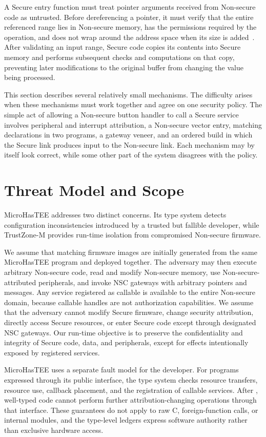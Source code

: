 \documentclass[sigconf]{acmart}
\begin{document}
A Secure entry function must treat pointer arguments received from Non-secure code as untrusted.
Before dereferencing a pointer, it must verify that the entire referenced range lies in Non-secure memory, has the permissions required by the operation, and does not wrap around the address space when its size is added~\cite{armCmse}.
After validating an input range, Secure code copies its contents into Secure memory and performs subsequent checks and computations on that copy, preventing later modifications to the original buffer from changing the value being processed.

This section describes several relatively small mechanisms.
The difficulty arises when these mechanisms must work together and agree on one security policy.
The simple act of allowing a Non-secure button handler to call a Secure service involves peripheral and interrupt attribution, a Non-secure vector entry, matching declarations in two programs, a gateway veneer, and an ordered build in which the Secure link produces input to the Non-secure link.
Each mechanism may by itself look correct, while some other part of the system disagrees with the policy.

\section{Threat Model and Scope}

MicroHasTEE addresses two distinct concerns.
Its type system detects configuration inconsistencies introduced by a trusted but fallible developer, while TrustZone-M provides run-time isolation from compromised Non-secure firmware.

We assume that matching firmware images are initially generated from the same MicroHasTEE program and deployed together.
The adversary may then execute arbitrary Non-secure code, read and modify Non-secure memory, use Non-secure-attributed peripherals, and invoke NSC gateways with arbitrary pointers and messages.
Any service registered as callable is available to the entire Non-secure domain, because callable handles are not authorization capabilities.
We assume that the adversary cannot modify Secure firmware, change security attribution, directly access Secure resources, or enter Secure code except through designated NSC gateways.
Our run-time objective is to preserve the confidentiality and integrity of Secure code, data, and peripherals, except for effects intentionally exposed by registered services.

MicroHasTEE uses a separate fault model for the developer.
For programs expressed through its public interface, the type system checks resource transfers, resource use, callback placement, and the registration of callable services.
After , well-typed code cannot perform further attribution-changing operations through that interface.
These guarantees do not apply to raw C, foreign-function calls, or internal modules, and the type-level ledgers express software authority rather than exclusive hardware access.
\end{document}
